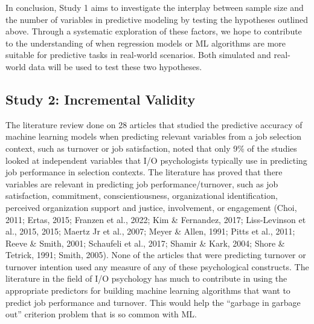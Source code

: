 \documentclass[
  man]{apa7}
\begin{document}
In conclusion, Study 1 aims to investigate the interplay between sample size and the number of variables in predictive modeling by testing the hypotheses outlined above.
Through a systematic exploration of these factors, we hope to contribute to the understanding of when regression models or ML algorithms are more suitable for predictive tasks in real-world scenarios.
Both simulated and real-world data will be used to test these two hypotheses.

\hypertarget{study-2-incremental-validity}{%
\subsection{Study 2: Incremental Validity}\label{study-2-incremental-validity}}

The literature review done on 28 articles that studied the predictive accuracy of machine learning models when predicting relevant variables from a job selection context, such as turnover or job satisfaction, noted that only 9\% of the studies looked at independent variables that I/O psychologists typically use in predicting job performance in selection contexts. The literature has proved that there variables are relevant in predicting job performance/turnover, such as job satisfaction, commitment, conscientiousness, organizational identification, perceived organization support and justice, involvement, or engagement (Choi, 2011; Ertas, 2015; Franzen et al., 2022; Kim \& Fernandez, 2017; Liss-Levinson et al., 2015, 2015; Maertz Jr et al., 2007; Meyer \& Allen, 1991; Pitts et al., 2011; Reeve \& Smith, 2001; Schaufeli et al., 2017; Shamir \& Kark, 2004; Shore \& Tetrick, 1991; Smith, 2005). None of the articles that were predicting turnover or turnover intention used any measure of any of these psychological constructs.
The literature in the field of I/O psychology has much to contribute in using the appropriate predictors for building machine learning algorithms that want to predict job performance and turnover.
This would help the ``garbage in garbage out'' criterion problem that is so common with ML.
\end{document}
